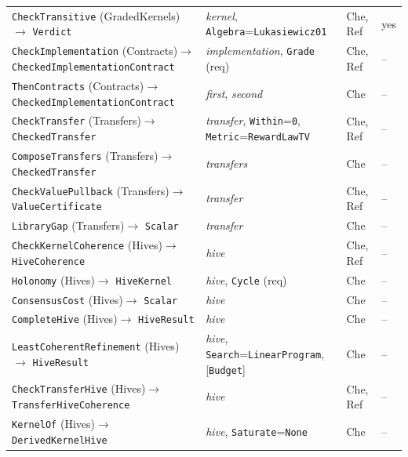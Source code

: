 \documentclass[11pt]{article}
\newcommand{\code}[1]{\texttt{#1}}
\theoremstyle{definition}
\theoremstyle{plain}
\begin{document}
{\begin{longtable}{>{\raggedright\arraybackslash}p{4.4cm}>{\raggedright\arraybackslash}p{6.8cm}>{\raggedright\arraybackslash}p{1.9cm}>{\raggedright\arraybackslash}p{0.5cm}}
\code{CheckTransitive} (GradedKernels)\newline$\to$ \code{Verdict} & \emph{kernel}, \code{Algebra}=\code{Lukasiewicz01} & Che, Ref & yes\\
\code{CheckImplementation} (Contracts)\newline$\to$ \code{CheckedImplementationContract} & \emph{implementation}, \code{Grade} (req) & Che, Ref & --\\
\code{ThenContracts} (Contracts)\newline$\to$ \code{CheckedImplementationContract} & \emph{first}, \emph{second} & Che & --\\
\code{CheckTransfer} (Transfers)\newline$\to$ \code{CheckedTransfer} & \emph{transfer}, \code{Within}=\code{0}, \code{Metric}=\code{RewardLawTV} & Che, Ref & --\\
\code{ComposeTransfers} (Transfers)\newline$\to$ \code{CheckedTransfer} & \emph{transfers} & Che & --\\
\code{CheckValuePullback} (Transfers)\newline$\to$ \code{ValueCertificate} & \emph{transfer} & Che, Ref & --\\
\code{LibraryGap} (Transfers)\newline$\to$ \code{Scalar} & \emph{transfer} & Che & --\\
\code{CheckKernelCoherence} (Hives)\newline$\to$ \code{HiveCoherence} & \emph{hive} & Che, Ref & --\\
\code{Holonomy} (Hives)\newline$\to$ \code{HiveKernel} & \emph{hive}, \code{Cycle} (req) & Che & --\\
\code{ConsensusCost} (Hives)\newline$\to$ \code{Scalar} & \emph{hive} & Che & --\\
\code{CompleteHive} (Hives)\newline$\to$ \code{HiveResult} & \emph{hive} & Che & --\\
\code{LeastCoherentRefinement} (Hives)\newline$\to$ \code{HiveResult} & \emph{hive}, \code{Search}=\code{LinearProgram}, [\code{Budget}] & Che & --\\
\code{CheckTransferHive} (Hives)\newline$\to$ \code{TransferHiveCoherence} & \emph{hive} & Che, Ref & --\\
\code{KernelOf} (Hives)\newline$\to$ \code{DerivedKernelHive} & \emph{hive}, \code{Saturate}=\code{None} & Che & --\\

\end{longtable}}
\end{document}
